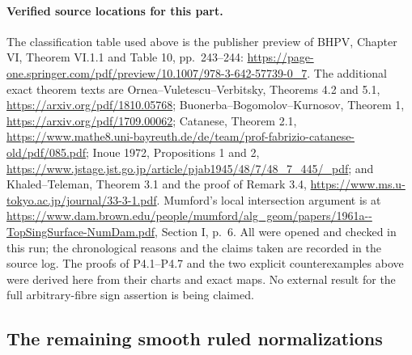 \paragraph{Verified source locations for this part.}
The classification table used above is the publisher preview of
BHPV, Chapter VI, Theorem VI.1.1 and Table 10, pp.~243--244:
\url{https://page-one.springer.com/pdf/preview/10.1007/978-3-642-57739-0_7}.
The additional exact theorem texts are Ornea--Vuletescu--Verbitsky,
Theorems 4.2 and 5.1, \url{https://arxiv.org/pdf/1810.05768};
Buonerba--Bogomolov--Kurnosov, Theorem 1,
\url{https://arxiv.org/pdf/1709.00062}; Catanese, Theorem 2.1,
\url{https://www.mathe8.uni-bayreuth.de/de/team/prof-fabrizio-catanese-old/pdf/085.pdf};
Inoue 1972, Propositions 1 and 2,
\url{https://www.jstage.jst.go.jp/article/pjab1945/48/7/48_7_445/_pdf};
and Khaled--Teleman, Theorem 3.1 and the proof of Remark 3.4,
\url{https://www.ms.u-tokyo.ac.jp/journal/33-3-1.pdf}.
Mumford's local intersection argument is at
\url{https://www.dam.brown.edu/people/mumford/alg_geom/papers/1961a--TopSingSurface-NumDam.pdf},
Section I, p.~6. All were opened and checked in this run; the
chronological reasons and the claims taken are recorded in the
source log. The proofs of P4.1--P4.7 and the two explicit
counterexamples above were derived here from their charts and
exact maps. No external result for the full arbitrary-fibre sign
assertion is being claimed.


\subsection{The remaining smooth ruled normalizations}

